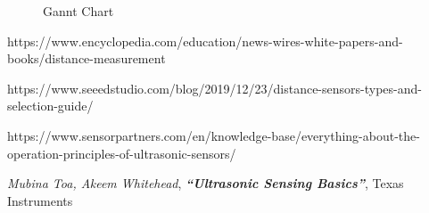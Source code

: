 \documentclass[12pt, a4paper]{article}
\begin{document}
        \begin{figure}[H]\centering
                \caption{Gannt Chart}
        \end{figure}



    


    \begin{thebibliography}{}	
        https://www.encyclopedia.com/education/news-wires-white-papers-and-books/distance-measurement

        https://www.seeedstudio.com/blog/2019/12/23/distance-sensors-types-and-selection-guide/

        https://www.sensorpartners.com/en/knowledge-base/everything-about-the-operation-principles-of-ultrasonic-sensors/ 
        
        \bibitem{}
        \textit{Mubina Toa, Akeem Whitehead}, \textbf{\textit{``Ultrasonic Sensing Basics''}}, Texas Instruments
    \end{thebibliography}
            
\end{document}
